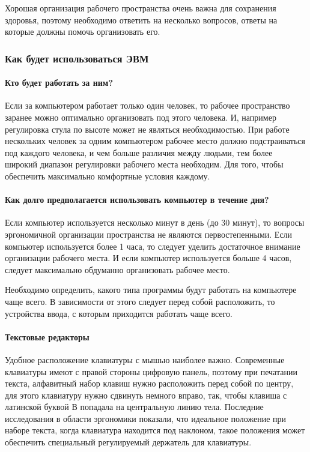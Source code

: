\documentclass[russian,utf8,emptystyle]{eskdtext}
\begin{document}
\begin{spacing}{1.5}
Хорошая организация рабочего пространства очень важна для сохранения здоровья, поэтому необходимо ответить на несколько вопросов, ответы на которые должны помочь организовать его.

\subsubsection{Как будет использоваться ЭВМ}

\paragraph{Кто будет работать за ним?}

Если за компьютером работает только один человек, то рабочее пространство заранее можно оптимально организовать под этого человека. И, например регулировка стула по высоте может не являться необходимостью. При работе нескольких человек за одним компьютером рабочее место должно подстраиваться под каждого человека, и чем больше различия между людьми, тем более широкий диапазон регулировки рабочего места необходим. Для того, чтобы обеспечить максимально комфортные условия каждому.

\paragraph{Как долго предполагается использовать компьютер в течение дня?}

Если компьютер используется несколько минут в день (до 30 минут), то вопросы эргономичной организации пространства не являются первостепенными. Если компьютер используется более 1 часа, то следует уделить достаточное внимание организации рабочего места. И если компьютер используется больше 4 часов, следует максимально обдуманно организовать рабочее место. 

Необходимо определить, какого типа программы будут работать на компьютере чаще всего. В зависимости от этого следует перед собой расположить, то устройства ввода, с которым приходится работать чаще всего.

\paragraph{Текстовые редакторы}
Удобное расположение клавиатуры с мышью наиболее важно. Современные клавиатуры имеют с правой стороны цифровую панель, поэтому при печатании текста, алфавитный набор клавиш нужно расположить перед собой по центру, для этого клавиатуру нужно сдвинуть немного вправо, так, чтобы клавиша с латинской буквой В попадала на центральную линию тела. Последние исследования в области эргономики показали, что идеальное положение при наборе текста, когда клавиатура находится под наклоном, такое положения может обеспечить специальный регулируемый держатель для клавиатуры.


\end{spacing}
\end{document}
